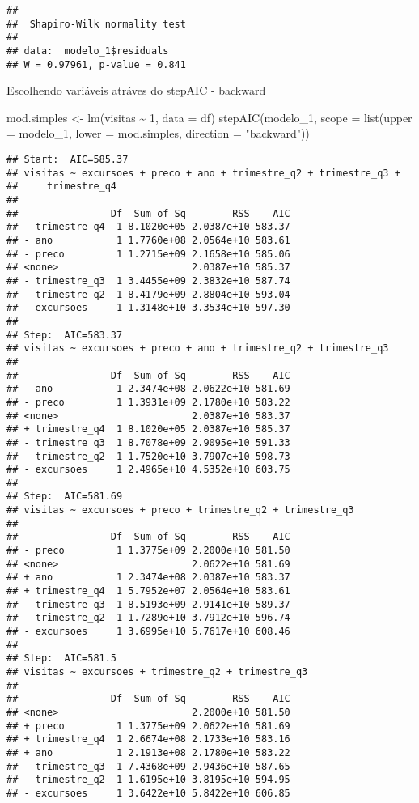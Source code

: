\documentclass[
]{article}
\newenvironment{Shaded}{\begin{snugshade}}{\end{snugshade}}
\newcommand{\AttributeTok}[1]{\textcolor[rgb]{0.77,0.63,0.00}{#1}}
\newcommand{\DecValTok}[1]{\textcolor[rgb]{0.00,0.00,0.81}{#1}}
\newcommand{\FunctionTok}[1]{\textcolor[rgb]{0.00,0.00,0.00}{#1}}
\newcommand{\NormalTok}[1]{#1}
\newcommand{\OtherTok}[1]{\textcolor[rgb]{0.56,0.35,0.01}{#1}}
\newcommand{\SpecialCharTok}[1]{\textcolor[rgb]{0.00,0.00,0.00}{#1}}
\newcommand{\StringTok}[1]{\textcolor[rgb]{0.31,0.60,0.02}{#1}}
\begin{document}
\begin{verbatim}
## 
##  Shapiro-Wilk normality test
## 
## data:  modelo_1$residuals
## W = 0.97961, p-value = 0.841
\end{verbatim}

Escolhendo variáveis atráves do stepAIC - backward

\begin{Shaded}
\begin{Highlighting}[]
\NormalTok{mod.simples  }\OtherTok{\textless{}{-}} \FunctionTok{lm}\NormalTok{(visitas }\SpecialCharTok{\textasciitilde{}} \DecValTok{1}\NormalTok{, }\AttributeTok{data =}\NormalTok{ df)}
\FunctionTok{stepAIC}\NormalTok{(modelo\_1, }\AttributeTok{scope =} \FunctionTok{list}\NormalTok{(}\AttributeTok{upper =}\NormalTok{ modelo\_1,}
                               \AttributeTok{lower =}\NormalTok{ mod.simples, }\AttributeTok{direction =} \StringTok{"backward"}\NormalTok{))}
\end{Highlighting}
\end{Shaded}

\begin{verbatim}
## Start:  AIC=585.37
## visitas ~ excursoes + preco + ano + trimestre_q2 + trimestre_q3 + 
##     trimestre_q4
## 
##                Df  Sum of Sq        RSS    AIC
## - trimestre_q4  1 8.1020e+05 2.0387e+10 583.37
## - ano           1 1.7760e+08 2.0564e+10 583.61
## - preco         1 1.2715e+09 2.1658e+10 585.06
## <none>                       2.0387e+10 585.37
## - trimestre_q3  1 3.4455e+09 2.3832e+10 587.74
## - trimestre_q2  1 8.4179e+09 2.8804e+10 593.04
## - excursoes     1 1.3148e+10 3.3534e+10 597.30
## 
## Step:  AIC=583.37
## visitas ~ excursoes + preco + ano + trimestre_q2 + trimestre_q3
## 
##                Df  Sum of Sq        RSS    AIC
## - ano           1 2.3474e+08 2.0622e+10 581.69
## - preco         1 1.3931e+09 2.1780e+10 583.22
## <none>                       2.0387e+10 583.37
## + trimestre_q4  1 8.1020e+05 2.0387e+10 585.37
## - trimestre_q3  1 8.7078e+09 2.9095e+10 591.33
## - trimestre_q2  1 1.7520e+10 3.7907e+10 598.73
## - excursoes     1 2.4965e+10 4.5352e+10 603.75
## 
## Step:  AIC=581.69
## visitas ~ excursoes + preco + trimestre_q2 + trimestre_q3
## 
##                Df  Sum of Sq        RSS    AIC
## - preco         1 1.3775e+09 2.2000e+10 581.50
## <none>                       2.0622e+10 581.69
## + ano           1 2.3474e+08 2.0387e+10 583.37
## + trimestre_q4  1 5.7952e+07 2.0564e+10 583.61
## - trimestre_q3  1 8.5193e+09 2.9141e+10 589.37
## - trimestre_q2  1 1.7289e+10 3.7912e+10 596.74
## - excursoes     1 3.6995e+10 5.7617e+10 608.46
## 
## Step:  AIC=581.5
## visitas ~ excursoes + trimestre_q2 + trimestre_q3
## 
##                Df  Sum of Sq        RSS    AIC
## <none>                       2.2000e+10 581.50
## + preco         1 1.3775e+09 2.0622e+10 581.69
## + trimestre_q4  1 2.6674e+08 2.1733e+10 583.16
## + ano           1 2.1913e+08 2.1780e+10 583.22
## - trimestre_q3  1 7.4368e+09 2.9436e+10 587.65
## - trimestre_q2  1 1.6195e+10 3.8195e+10 594.95
## - excursoes     1 3.6422e+10 5.8422e+10 606.85
\end{verbatim}
\end{document}
